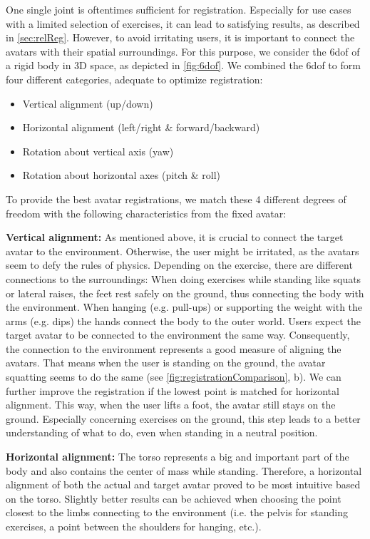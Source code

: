 One single joint is oftentimes sufficient for registration. Especially for use cases with a limited selection of exercises, it can lead to satisfying results, as described in \autoref{sec:relReg}. However, to avoid irritating users, it is important to connect the avatars with their spatial surroundings. For this purpose, we consider the \acrfull{6dof} of a rigid body in 3D space, as depicted in \autoref{fig:6dof}. We combined the \acrshort{6dof} to form four different categories, adequate to optimize registration:
\begin{itemize}
	\setlength{\itemsep}{-0.3cm}
	\item Vertical alignment (up/down)
	\item Horizontal alignment (left/right \& forward/backward)
	\item Rotation about vertical axis (yaw)
	\item Rotation about horizontal axes (pitch \& roll)
\end{itemize}

To provide the best avatar registrations, we match these 4 different degrees of freedom with the following characteristics from the fixed avatar:

\textbf{Vertical alignment:} As mentioned above, it is crucial to connect the target avatar to the environment. Otherwise, the user might be irritated, as the avatars seem to defy the rules of physics. Depending on the exercise, there are different connections to the surroundings: When doing exercises while standing like squats or lateral raises, the feet rest safely on the ground, thus connecting the body with the environment. When hanging (e.g. pull-ups) or supporting the weight with the arms (e.g. dips) the hands connect the body to the outer world. Users expect the target avatar to be connected to the environment the same way. Consequently, the connection to the environment represents a good measure of aligning the avatars. That means when the user is standing on the ground, the avatar squatting seems to do the same (see \autoref{fig:registrationComparison}, b). We can further improve the registration if the lowest point is matched for horizontal alignment. This way, when the user lifts a foot, the avatar still stays on the ground. Especially concerning exercises on the ground, this step leads to a better understanding of what to do, even when standing in a neutral position.

\textbf{Horizontal alignment:} The torso represents a big and important part of the body and also contains the center of mass while standing. Therefore, a horizontal alignment of both the actual and target avatar proved to be most intuitive based on the torso. Slightly better results can be achieved when choosing the point closest to the limbs connecting to the environment (i.e. the pelvis for standing exercises, a point between the shoulders for hanging, etc.).

